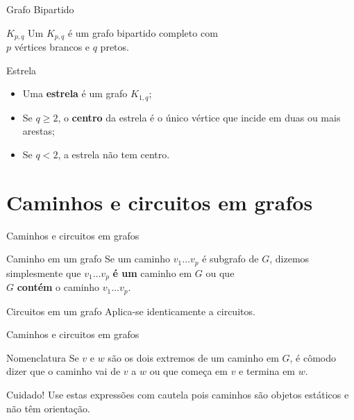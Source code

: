 \documentclass[xcolor=dvipsnames,table]{beamer}
\begin{document}
	\begin{frame}{Grafo Bipartido}
		\begin{block}{$K_{p,q}$}
			Um $K_{p,q}$ é um grafo bipartido completo com \\$p$ vértices brancos e $q$ pretos.
		\end{block} 
		\begin{block}{Estrela}
			\begin{itemize}
				\item Uma {\bf estrela} é um grafo $K_{1,q}$;
				\item Se $q \geq 2$, o {\bf centro} da estrela é o único vértice que incide em duas ou mais arestas;
				\item Se $q < 2$, a estrela não tem centro.
			\end{itemize}
		\end{block}
	\end{frame}
	
	\section{Caminhos e circuitos em grafos}
	\begin{frame}{Caminhos e circuitos em grafos}
		\begin{block}{Caminho em um grafo}
			Se um caminho $v_1 \ldots v_p$ é subgrafo de $G$, dizemos simplesmente que $v_1 \ldots v_p$ {\bf é um} caminho em $G$ ou que \\$G$ {\bf contém} o caminho $v_1 \ldots v_p$.
		\end{block} \pause
		\begin{exampleblock}{Circuitos em um grafo}
			Aplica-se identicamente a circuitos.
		\end{exampleblock} 
	\end{frame}
	
	\begin{frame}{Caminhos e circuitos em grafos}
		\begin{block}{Nomenclatura}
			Se $v$ e $w$ são os dois extremos de um caminho em $G$, é cômodo dizer que o caminho vai de $v$ a $w$ ou que começa em $v$ e termina em $w$.
		\end{block} \pause
		\begin{alertblock}{Cuidado!}
			Use estas expressões com cautela pois caminhos são objetos estáticos e não têm orientação.
		\end{alertblock}
	\end{frame}
	
\end{document}
